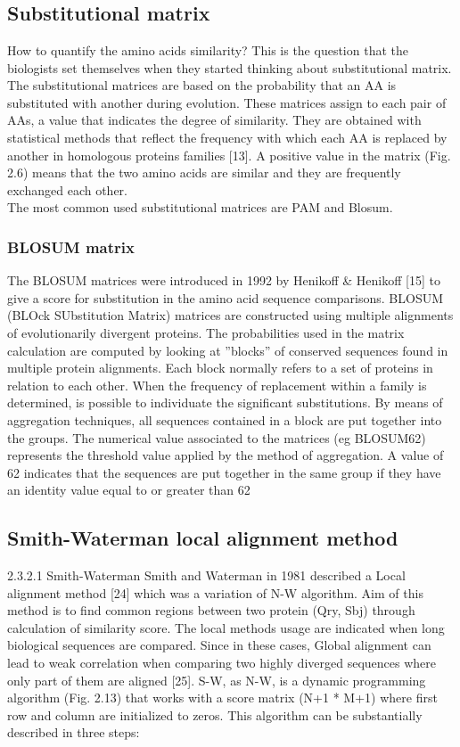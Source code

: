 \chapter{}
\section{Substitutional matrix}
How to quantify the amino acids similarity? This is the question that the biologists set themselves when they started thinking about substitutional matrix.
The substitutional matrices are based on the probability that an AA is substituted with another during evolution. These matrices assign to each pair of AAs, a value that indicates the degree of similarity. They are obtained with statistical methods that reﬂect the frequency with which each AA is replaced by another in homologous proteins families [13]. A positive value in the matrix (Fig. 2.6) means that the two amino acids are similar and they are frequently exchanged each other. \\
The most common used substitutional matrices are PAM and Blosum.
\subsection{BLOSUM matrix}
The BLOSUM matrices were introduced in 1992 by Henikoﬀ & Henikoﬀ [15] to give a score for substitution in the amino acid sequence comparisons.
BLOSUM (BLOck SUbstitution Matrix) matrices are constructed using multiple alignments of evolutionarily divergent proteins. The probabilities used in the matrix calculation are computed by looking at ”blocks” of conserved sequences found in multiple protein alignments. Each block normally refers to a set of proteins in relation to each other. When the frequency of replacement within a family is determined, is possible to individuate the signiﬁcant substitutions. By means of aggregation techniques, all sequences contained in a block are put together into the groups. The numerical value associated to the matrices (eg BLOSUM62) represents the threshold value applied by the method of aggregation. A value of 62 indicates that the sequences are put together in the same group if they have an identity value equal to or greater than 62%

\section{Smith-Waterman local alignment method}
2.3.2.1 Smith-Waterman
Smith and Waterman in 1981 described a Local alignment method [24] which was a variation of N-W algorithm. Aim of this method is to ﬁnd common regions between two protein (Qry, Sbj) through calculation of similarity score. The local methods usage are indicated when long biological sequences are compared. Since in these cases, Global alignment can lead to weak correlation when comparing two highly diverged sequences where only part of them are aligned [25]. S-W, as N-W, is a dynamic programming algorithm (Fig. 2.13) that works with a score matrix (N+1 * M+1) where ﬁrst row and column are initialized to zeros. This algorithm can be substantially described in three steps:
